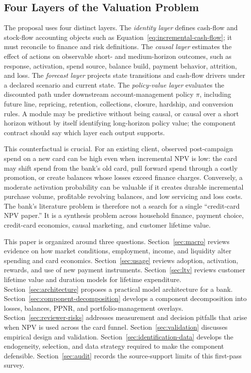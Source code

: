 \documentclass[11pt]{article}
\newcommand{\1}{\mathbf{1}}
\begin{document}
\subsection*{Four Layers of the Valuation Problem}

The proposal uses four distinct layers. The \emph{identity layer} defines
cash-flow and stock-flow accounting objects such as
Equation~\eqref{eq:incremental-cash-flow}; it must reconcile to finance and
risk definitions. The \emph{causal layer} estimates the effect of actions on
observable short- and medium-horizon outcomes, such as response, activation,
spend source, balance build, payment behavior, attrition, and loss. The
\emph{forecast layer} projects state transitions and cash-flow drivers under a
declared scenario and current state. The \emph{policy-value layer} evaluates
the discounted path under downstream account-management policy $\pi$, including
future line, repricing, retention, collections, closure, hardship, and
conversion rules. A module may be predictive without being causal, or causal
over a short horizon without by itself identifying long-horizon policy value;
the component contract should say which layer each output supports.

This counterfactual is crucial. For an existing client, observed post-campaign
spend on a new card can be high even when incremental NPV is low: the card may
shift spend from the bank's old card, pull forward spend through a costly
promotion, or create balances whose losses exceed finance charges. Conversely, a
moderate activation probability can be valuable if it creates durable
incremental purchase volume, profitable revolving balances, and low servicing
and loss costs. The bank's literature problem is therefore not a search for a
single ``credit-card NPV paper.'' It is a synthesis problem across household
finance, payment choice, credit-card economics, causal marketing, and customer
lifetime value.

This paper is organized around three questions. Section~\ref{sec:macro}
reviews evidence on how market conditions, employment, income, and liquidity
alter spending and card economics. Section~\ref{sec:usage} reviews adoption,
activation, rewards, and use of new payment instruments. Section~\ref{sec:ltv}
reviews customer lifetime value and duration models for lifetime expenditure.
Section~\ref{sec:architecture} proposes a practical model architecture for a
bank. Section~\ref{sec:component-decomposition} develops a component
decomposition into losses, balances, PPNR, and portfolio-management overlays.
Section~\ref{sec:reviewer-risks} addresses measurement and decision
pitfalls that arise when NPV is used across the card funnel.
Section~\ref{sec:validation} discusses empirical design and validation.
Section~\ref{sec:identification-data} develops the endogeneity, selection, and
data strategy required to make the component defensible.
Section~\ref{sec:audit} records the source-support limits of this first-pass
survey.
\end{document}
